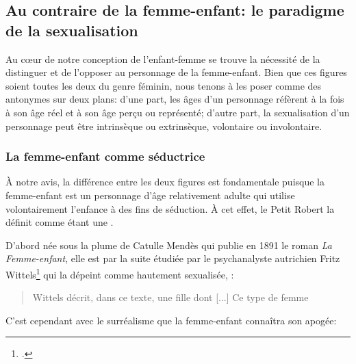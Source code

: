 \subsection{Au contraire de la femme-enfant: le paradigme de la sexualisation}
Au c\oe{}ur de notre conception de l'enfant-femme se trouve la nécessité de la distinguer et de l'opposer au personnage de la femme-enfant.
Bien que ces figures soient toutes les deux du genre féminin, nous tenons à les poser comme des antonymes sur deux plans:  d'une part, les âges d'un personnage réfèrent à la fois à son âge réel et à son âge perçu ou représenté; d'autre part, la sexualisation d'un personnage peut être intrinsèque ou extrinsèque, volontaire ou involontaire.

\subsubsection{La femme-enfant comme séductrice}
À notre avis, la différence entre les deux figures est fondamentale puisque la femme-enfant est un personnage d'âge relativement adulte qui utilise volontairement l'enfance à des fins de séduction.
À cet effet, le Petit Robert la définit comme étant une .
\par
D'abord née sous la plume de Catulle Mendès qui publie en 1891 le roman \textit{La Femme-enfant}, elle est par la suite étudiée par le psychanalyste autrichien Fritz Wittels\footcite{Wittels1999} qui la dépeint comme hautement sexualisée, :
\begin{quote}
  \begin{singlespace}
    \small
    Wittels décrit, dans ce texte, une fille dont  [...] Ce type de femme 
    \normalsize
  \end{singlespace}
\end{quote}
C'est cependant avec le surréalisme que la femme-enfant connaîtra son apogée: 
